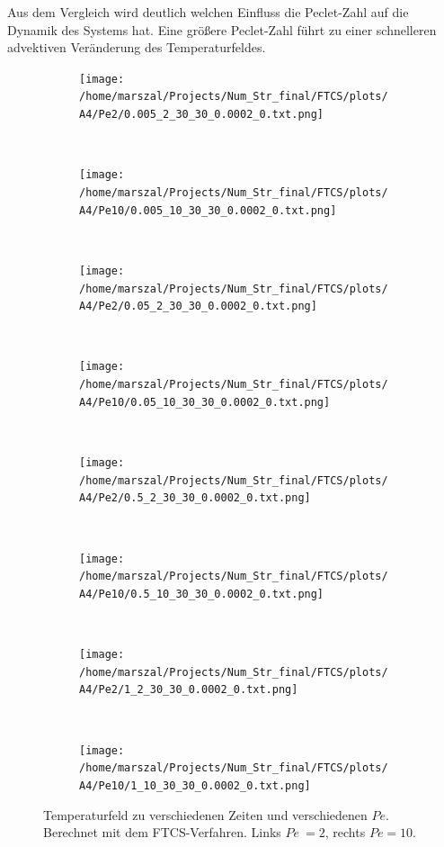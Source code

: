 Aus dem Vergleich wird deutlich welchen Einfluss die Peclet-Zahl auf die Dynamik des Systems hat. Eine größere Peclet-Zahl führt zu einer schnelleren advektiven Veränderung des Temperaturfeldes.

\begin{figure}
  \centering
    \begin{subfigure}[b]{0.48\textwidth}
      \texttt{[image: /home/marszal/Projects/Num\_Str\_final/FTCS/plots/A4/Pe2/0.005\_2\_30\_30\_0.0002\_0.txt.png]}
    \end{subfigure}
    ~
    \begin{subfigure}[b]{0.48\textwidth}
      \texttt{[image: /home/marszal/Projects/Num\_Str\_final/FTCS/plots/A4/Pe10/0.005\_10\_30\_30\_0.0002\_0.txt.png]}
    \end{subfigure}
    \\
    \begin{subfigure}[b]{0.48\textwidth}
      \texttt{[image: /home/marszal/Projects/Num\_Str\_final/FTCS/plots/A4/Pe2/0.05\_2\_30\_30\_0.0002\_0.txt.png]}
    \end{subfigure}
    ~
    \begin{subfigure}[b]{0.48\textwidth}
      \texttt{[image: /home/marszal/Projects/Num\_Str\_final/FTCS/plots/A4/Pe10/0.05\_10\_30\_30\_0.0002\_0.txt.png]}
    \end{subfigure}
    \\
    \begin{subfigure}[b]{0.48\textwidth}
      \texttt{[image: /home/marszal/Projects/Num\_Str\_final/FTCS/plots/A4/Pe2/0.5\_2\_30\_30\_0.0002\_0.txt.png]}
    \end{subfigure}
    ~
    \begin{subfigure}[b]{0.48\textwidth}
      \texttt{[image: /home/marszal/Projects/Num\_Str\_final/FTCS/plots/A4/Pe10/0.5\_10\_30\_30\_0.0002\_0.txt.png]}
    \end{subfigure}
    \\
    \begin{subfigure}[b]{0.48\textwidth}
      \texttt{[image: /home/marszal/Projects/Num\_Str\_final/FTCS/plots/A4/Pe2/1\_2\_30\_30\_0.0002\_0.txt.png]}
    \end{subfigure}
    ~
    \begin{subfigure}[b]{0.48\textwidth}
      \texttt{[image: /home/marszal/Projects/Num\_Str\_final/FTCS/plots/A4/Pe10/1\_10\_30\_30\_0.0002\_0.txt.png]}
    \end{subfigure}
  \caption{Temperaturfeld zu verschiedenen Zeiten und verschiedenen $Pe$. Berechnet mit dem FTCS-Verfahren. Links $Pe~=2$, rechts $Pe=10$.}\label{fig:FTCSnaive}
\end{figure}
